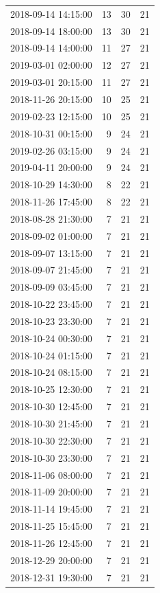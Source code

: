 \begin{tabular}{lrrr}
2018-09-14 14:15:00 & 13 & 30 & 21 \\
2018-09-14 18:00:00 & 13 & 30 & 21 \\
2018-09-14 14:00:00 & 11 & 27 & 21 \\
2019-03-01 02:00:00 & 12 & 27 & 21 \\
2019-03-01 20:15:00 & 11 & 27 & 21 \\
2018-11-26 20:15:00 & 10 & 25 & 21 \\
2019-02-23 12:15:00 & 10 & 25 & 21 \\
2018-10-31 00:15:00 & 9 & 24 & 21 \\
2019-02-26 03:15:00 & 9 & 24 & 21 \\
2019-04-11 20:00:00 & 9 & 24 & 21 \\
2018-10-29 14:30:00 & 8 & 22 & 21 \\
2018-11-26 17:45:00 & 8 & 22 & 21 \\
2018-08-28 21:30:00 & 7 & 21 & 21 \\
2018-09-02 01:00:00 & 7 & 21 & 21 \\
2018-09-07 13:15:00 & 7 & 21 & 21 \\
2018-09-07 21:45:00 & 7 & 21 & 21 \\
2018-09-09 03:45:00 & 7 & 21 & 21 \\
2018-10-22 23:45:00 & 7 & 21 & 21 \\
2018-10-23 23:30:00 & 7 & 21 & 21 \\
2018-10-24 00:30:00 & 7 & 21 & 21 \\
2018-10-24 01:15:00 & 7 & 21 & 21 \\
2018-10-24 08:15:00 & 7 & 21 & 21 \\
2018-10-25 12:30:00 & 7 & 21 & 21 \\
2018-10-30 12:45:00 & 7 & 21 & 21 \\
2018-10-30 21:45:00 & 7 & 21 & 21 \\
2018-10-30 22:30:00 & 7 & 21 & 21 \\
2018-10-30 23:30:00 & 7 & 21 & 21 \\
2018-11-06 08:00:00 & 7 & 21 & 21 \\
2018-11-09 20:00:00 & 7 & 21 & 21 \\
2018-11-14 19:45:00 & 7 & 21 & 21 \\
2018-11-25 15:45:00 & 7 & 21 & 21 \\
2018-11-26 12:45:00 & 7 & 21 & 21 \\
2018-12-29 20:00:00 & 7 & 21 & 21 \\
2018-12-31 19:30:00 & 7 & 21 & 21 \\

\end{tabular}
